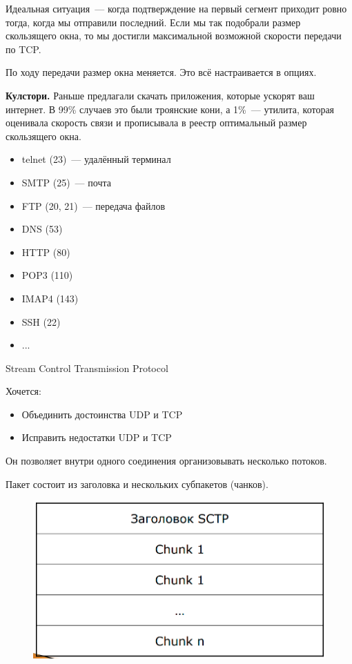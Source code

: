 Идеальная ситуация~--- когда подтверждение на первый сегмент приходит ровно тогда, когда мы отправили последний. Если мы так подобрали размер скользящего окна, то мы достигли максимальной возможной скорости передачи по TCP.

По ходу передачи размер окна меняется. Это всё настраивается в опциях.

{\bf Кулстори.} Раньше предлагали скачать приложения, которые ускорят ваш интернет. В 99\% случаев это были троянские кони, а 1\%~--- утилита, которая оценивала скорость связи и прописывала в реестр оптимальный размер скользящего окна.


\begin{itemize}
    \item telnet (23)~--- удалённый терминал
    \item SMTP (25)~--- почта
    \item FTP (20, 21)~--- передача файлов
    \item DNS (53)
    \item HTTP (80)
    \item POP3 (110)
    \item IMAP4 (143)
    \item SSH (22)
    \item ...
\end{itemize}


Stream Control Transmission Protocol

Хочется:
\begin{itemize}
    \item Объединить достоинства UDP и TCP
    \item Исправить недостатки UDP и TCP
\end{itemize}

Он позволяет внутри одного соединения организовывать несколько потоков.

Пакет состоит из заголовка и нескольких субпакетов (чанков).

\begin{figure}[H]
  \centering
  \includegraphics[width=15cm]{images/03/07}
\end{figure}

